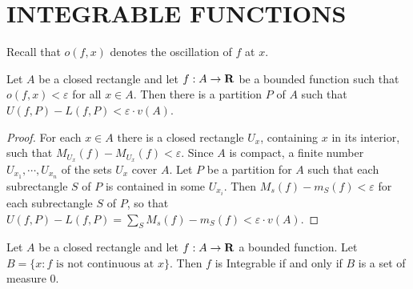 \section{INTEGRABLE FUNCTIONS}
Recall that $o(f,x)$ denotes the oscillation of $f$ at $x$.
\begin{lemma}
    Let $A$ be a closed rectangle and let $f:A\to \mathbf{R}$ be a bounded 
    function such that $o(f, x)<\varepsilon$ for all $x\in A$. Then 
    there is a partition $P$ of $A$ such that $U(f, P)-L(f, P)<\varepsilon\cdot v(A)$.
\end{lemma}

\begin{proof}
    For each $x \in A$ there is a closed rectangle $U_x$,
containing $x$ in its interior, such that $M_{U_x}(f) - M_{U_x}(f) < \varepsilon$.
Since $A$ is compact, a finite number $U_{x_1}, \cdots, U_{x_n}$ of the
sets $U_x$ cover $A$. Let $P$ be a partition for $A$ such that each
subrectangle $S$ of $P$ is contained in some $U_{x_i}$. Then 
$M_s(f) - m_S(f)< \varepsilon$ for each subrectangle $S$ of $P$, so that 
$U(f, P)-L(f, P)=\sum_{S}^{}{M_s(f)-m_S(f)}<\varepsilon\cdot v(A)$.
\end{proof}

\begin{theorem}
    Let $A$ be a closed rectangle and let $f:A\to \mathbf{R}$ a bounded function.
    Let $B=\{x:f\text{ is not continuous at } x\}$. Then $f$ is Integrable if 
    and only if $B$ is a set of measure 0.
\end{theorem}

